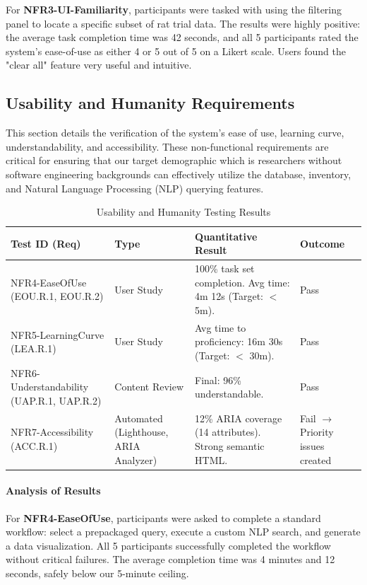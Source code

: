 \documentclass[12pt, titlepage]{article}
\begin{document}
For \textbf{NFR3-UI-Familiarity}, participants were tasked with using the filtering panel to locate a specific subset of rat trial data. The results were highly positive: the average task completion time was 42 seconds, and all 5 participants rated the system's ease-of-use as either 4 or 5 out of 5 on a Likert scale. Users found the "clear all" feature very useful and intuitive.


\subsection{Usability and Humanity Requirements}
\label{sec:usability_humanity_results}

This section details the verification of the system's ease of use, learning curve, understandability, and accessibility.
 These non-functional requirements are critical for ensuring that our target demographic which is researchers without software
  engineering backgrounds can effectively utilize the database, inventory, and Natural Language Processing (NLP) querying 
  features. 

\begin{table}[h!]
\centering
\caption{Usability and Humanity Testing Results}
\label{tab:usability_results}
\begin{tabular}{|p{3.5cm}|p{2cm}|p{4.5cm}|p{3.5cm}|}
\hline
\textbf{Test ID (Req)} & \textbf{Type} & \textbf{Quantitative Result} & \textbf{Outcome} \\ \hline
NFR4-EaseOfUse (EOU.R.1, EOU.R.2) & User Study & 100\% task set completion. Avg time: 4m 12s (Target: $<$ 5m). & Pass \\ \hline
NFR5-LearningCurve (LEA.R.1) & User Study & Avg time to proficiency: 16m 30s (Target: $<$ 30m). & Pass \\ \hline
NFR6-Understandability (UAP.R.1, UAP.R.2) & Content Review & Final: 96\% understandable. & Pass \\ \hline
NFR7-Accessibility (ACC.R.1) & Automated (Lighthouse, ARIA Analyzer) & 12\% ARIA coverage (14 attributes). Strong semantic HTML. & Fail $\rightarrow$ Priority issues created \\ \hline\end{tabular}
\end{table}

\paragraph{Analysis of Results}
For \textbf{NFR4-EaseOfUse}, participants were asked to complete a standard workflow: select a prepackaged query, execute a custom NLP search, and generate a data visualization. All 5 participants successfully completed the workflow without critical failures. The average completion time was 4 minutes and 12 seconds, safely below our 5-minute ceiling. 
\end{document}
